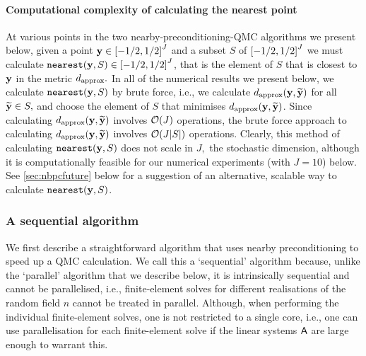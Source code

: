 \paragraph{Computational complexity of calculating the nearest point} At various points in the two nearby-preconditioning-QMC algorithms we present below, given a point $\by \in \cube{J}$ and a subset $S$ of $\cube{J}$ we must calculate $\nearest(\by,S) \in \cube{J}$, that is the element of $S$ that is closest to $\mathbf{y}$ in the metric $d_{\mathrm{approx}}.$ In all of the numerical results we present below, we calculate $\mathtt{nearest}(\mathbf{y},S)$ by brute force, i.e., we calculate $d_{\mathrm{approx}}(\mathbf{y},\widetilde{\mathbf{y}})$ for all $\widetilde{\mathbf{y}} \in S,$ and choose the element of $S$ that minimises $d_{\mathrm{approx}}(\mathbf{y},\widetilde{\mathbf{y}})$. Since calculating $d_{\mathrm{approx}}(\mathbf{y},\widetilde{\mathbf{y}})$ involves $\cO\mleft(J\mright)$ operations, the brute force approach to calculating $d_{\mathrm{approx}}(\mathbf{y},\widetilde{\mathbf{y}})$ involves $\cO\mleft(J\abs{S}\mright)$ operations. Clearly, this method of calculating $\mathtt{nearest}(\mathbf{y},S)$ does not scale in $J,$ the stochastic dimension, although it is computationally feasible for our numerical experiments (with $J=10$) below. See \cref{sec:nbpcfuture} below for a suggestion of an alternative, scalable way to calculate $\mathtt{nearest}(\mathbf{y},S)$.

\subsubsection{A sequential algorithm}
We first describe a straightforward algorithm that uses nearby preconditioning to speed up a QMC calculation. We call this a `sequential' algorithm because, unlike the `parallel' algorithm that we describe below, it is intrinsically sequential and cannot be parallelised, i.e., finite-element solves for different realisations of the random field $n$ cannot be treated in parallel. Although, when performing the individual finite-element solves, one is not restricted to a single core, i.e., one can use parallelisation for each finite-element solve  if the linear systems $\mathsf{A}$ are large enough to warrant this.

